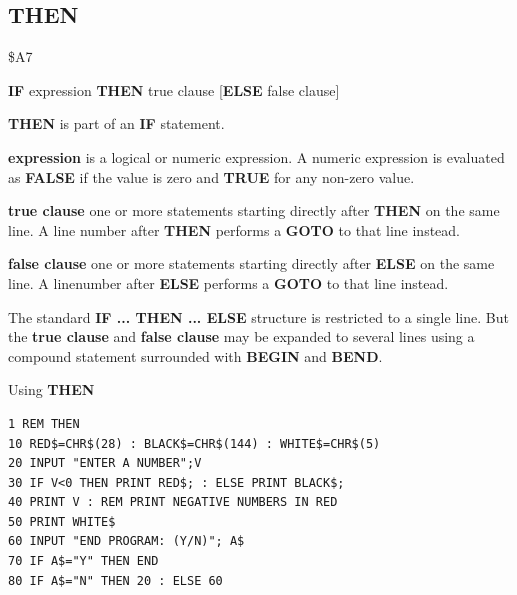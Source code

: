\subsection{THEN}
\begin{description}[leftmargin=2cm,style=nextline]
\item [Token:] \$A7
\item [Format:] {\bf IF} expression {\bf THEN} true clause
		[{\bf ELSE} false clause]
\item [Usage:] {\bf THEN} is part of an {\bf IF} statement.

                {\bf expression} is a logical or numeric expression.
                A numeric expression is evaluated as {\bf FALSE}
                if the value is zero and {\bf TRUE} for any non-zero
                value.

                {\bf true clause} one or more statements starting
                directly after {\bf THEN} on the same line.
                A line number after {\bf THEN} performs a
                {\bf GOTO} to that line instead.

                {\bf false clause} one or more statements starting
                directly after {\bf ELSE} on the same line.
                A linenumber after {\bf ELSE} performs a
                {\bf GOTO} to that line instead.

\item [Remarks:]
               The standard {\bf IF ... THEN ... ELSE} structure
               is restricted to a single line. But the {\bf true clause}
               and {\bf false clause} may be expanded to several lines
               using a compound statement surrounded with
               {\bf BEGIN} and {\bf BEND}.
\item [Example:]
                Using {\bf THEN}
\begin{tcolorbox}[colback=black,coltext=white]
\verbatimfont{\codefont}
\begin{verbatim}
1 REM THEN
10 RED$=CHR$(28) : BLACK$=CHR$(144) : WHITE$=CHR$(5)
20 INPUT "ENTER A NUMBER";V
30 IF V<0 THEN PRINT RED$; : ELSE PRINT BLACK$;
40 PRINT V : REM PRINT NEGATIVE NUMBERS IN RED
50 PRINT WHITE$
60 INPUT "END PROGRAM: (Y/N)"; A$
70 IF A$="Y" THEN END
80 IF A$="N" THEN 20 : ELSE 60
\end{verbatim}
\end{tcolorbox}
\end{description}


